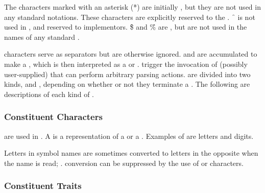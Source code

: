 The characters marked with an asterisk (*) are initially ,
but they are not used in any standard \commonlisp{} notations.
These characters are explicitly reserved to the .
\f{~} is not used in \commonlisp{}, and reserved to implementors.
\f{\$} and \f{\%} are  ,
but are not used in the names of any standard \commonlisp{} .

 characters serve as separators but are otherwise
ignored.   and   are accumulated
to make a , which is then interpreted as a  or .
 trigger the invocation of  (possibly
user-supplied) that can perform arbitrary parsing actions.
 are divided into two kinds,
 and ,
depending on whether or not they terminate a .
The following are descriptions of each kind of .

\subsubsection{Constituent Characters}

  are used in .
A  is a representation of a  or a .  
Examples of   are letters and digits.

Letters in symbol names are sometimes converted to 
letters in the opposite  when the name is read;
\seesection\ReadtableCaseReadEffect.
 conversion can be suppressed by the use 
of  or  characters.

\subsubsection{Constituent Traits}

